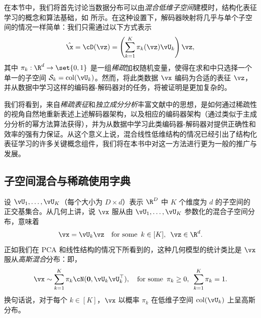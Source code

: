 \documentclass[../../book-main_zh.tex]{subfiles}
\begin{document}

在本节中，我们将首先讨论当数据分布可以由{\em 混合低维子空间}建模时，结构化表征学习的概念和算法基础，如
 所示。在这种设置下，解码器映射将几乎与单个子空间的情况一样简单：我们只需通过以下方式表示
\begin{equation}\label{eq:mixture-subspaces-decoder-first-cut}
    \hat{\x} = \cD(\vz) = \left( \sum_{k=1}^K \pi_k(\vz)\vU_k \right) \vz,
\end{equation}
其中 $\pi_k : \R^d \to \set{0,1}$
是一组\textit{稀疏}加权随机变量，使得在求和中只选择一个单一的子空间 $\mathcal{S}_k
= \mathop{\mathrm{col}}(\vU_k)$。然而，将此类数据 $\vx$ 编码为合适的表征
$\vz$，并从数据中学习这样的编码器-解码器对的任务，将被证明是更加复杂的。

我们将看到，来自\textit{稀疏表征}和\textit{独立成分分析}丰富文献中的思想，是如何通过稀疏性的视角自然地重新表述上述解码器架构，以及相应的编码器架构（通过类似于主成分分析的幂方法算法获得），并为从数据中学习此类编码器-解码器对提供正确性和效率的强有力保证。从这个意义上说，混合线性低维结构的情况已经引出了结构化表征学习的许多关键概念组件，我们将在本书中对这一方法进行更为一般的推广与发展。

\subsection{子空间混合与稀疏使用字典}\label{sec:mixture-and-dict}

设 $\vU_1, \dots, \vU_K$（每个大小为 $D \times d$）表示 $\R^D$ 中 $K$ 个维度为 $d$
的子空间的正交基集合。从几何上讲，说 $\vx$ 服从由 $\vU_1, \dots, \vU_K$ 参数化的混合子空间分布，意味着
\begin{equation}\label{eq:mixture-of-subspaces-geometric}
    \vx = \vU_k \vz  \quad \text{for some} \enspace k \in
    [K],\enspace \vz \in \R^d.
\end{equation}
正如我们在 PCA 和线性结构的情况下所看到的，这种几何模型的统计类比是 $\vx$ 服从\textit{高斯混合}分布：即，
\begin{equation}\label{eq:mixture-of-subspaces-statistical}
    \vx \sim \sum_{k=1}^K \pi_k \cN(\mathbf{0}, \vU_k\vU_k^\top),
    \quad \text{for some} \enspace \pi_k \geq 0,\enspace \sum_{k=1}^K \pi_k = 1.
\end{equation}
换句话说，对于每个 $k \in [K]$，$\vx$ 以概率 $\pi_k$ 在低维子空间
$\mathop{\mathrm{col}}(\vU_k)$ 上呈高斯分布。
\end{document}
